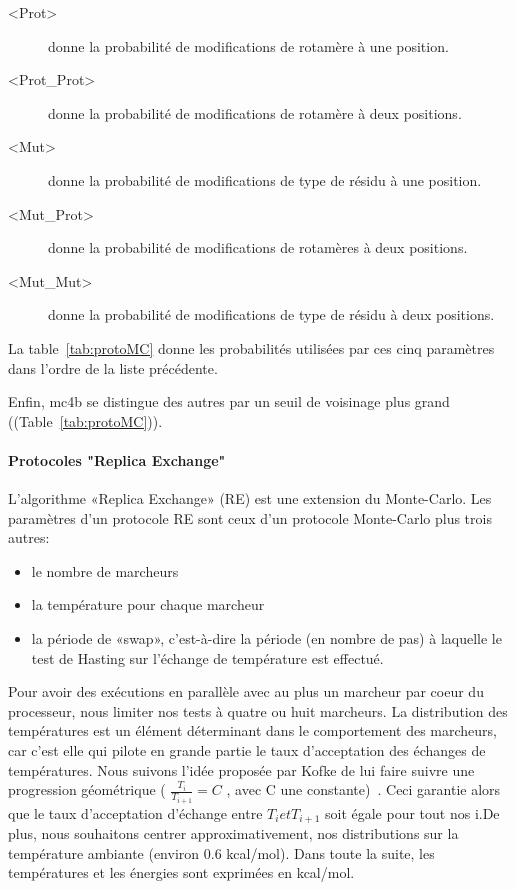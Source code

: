 \begin{description}
\item[<Prot>] donne la probabilité de modifications de  rotamère à une position.
\item[<Prot\_Prot>] donne la probabilité de modifications de  rotamère à deux positions.
\item[<Mut>] donne la probabilité de modifications de type de résidu à une position.
\item[<Mut\_Prot>] donne la probabilité de modifications de  rotamères à deux positions.
\item[<Mut\_Mut>] donne la probabilité de modifications de type de résidu à deux positions.
\end{description}

La table~\ref{tab:protoMC} donne les probabilités utilisées par ces cinq paramètres dans l'ordre de la liste précédente. 

Enfin, mc4b se distingue des autres par un seuil de voisinage plus grand ((Table~\ref{tab:protoMC})).

   \paragraph{Protocoles "Replica Exchange"} 

L'algorithme «Replica Exchange» (RE) est une extension du Monte-Carlo. Les paramètres d'un protocole RE sont ceux d'un protocole Monte-Carlo plus trois autres:

\begin{itemize}
\item le nombre de marcheurs
\item la température pour chaque marcheur
\item la période de «swap», c'est-à-dire la période (en nombre de pas) à laquelle le test de Hasting sur l'échange de température est effectué.
\end{itemize}
Pour avoir des exécutions en parallèle avec au plus un marcheur par coeur du processeur, nous limiter nos tests à quatre ou huit marcheurs.
La distribution des températures est un élément déterminant dans le comportement des marcheurs, car c'est elle qui pilote en grande partie le taux d'acceptation des échanges de températures. Nous suivons l'idée proposée par Kofke de lui faire suivre une progression géométrique ( $ \frac{T_i}{T_{i+1}}=C $ , avec C une constante)~\citep{refRE1,refRE2,refRE3}. Ceci garantie alors que le taux d'acceptation d'échange entre $T_i et T_{i+1}$ soit égale pour tout nos i.De plus, nous souhaitons centrer approximativement, nos distributions sur la température ambiante (environ 0.6 kcal/mol). Dans toute la suite, les températures et les énergies sont exprimées en kcal/mol.


